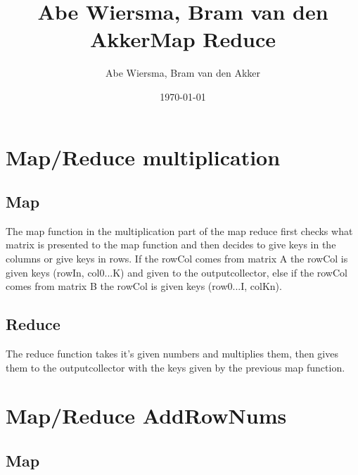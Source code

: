 \documentclass[10pt]{article}
\title{\bfseries\Huge Abe Wiersma, Bram van den Akker}
\date{}
\begin{document}
\title{Map Reduce}
\author{Abe Wiersma, Bram van den Akker}
\date{\today}
\maketitle
\newpage

\section{Map/Reduce multiplication}
\subsection{Map}
The map function in the multiplication part of the map reduce first checks what matrix is presented to the map function and then decides to give keys in the columns or give keys in rows. If the rowCol comes from matrix A the rowCol is given keys (rowIn, col0...K) and given to the outputcollector, else if the rowCol comes from matrix B the rowCol is given keys (row0...I, colKn).

\subsection{Reduce}
The reduce function takes it's given numbers and multiplies them, then gives them to the outputcollector with the keys given by the previous map function.

\section{Map/Reduce AddRowNums}
\subsection{Map}
\end{document}
